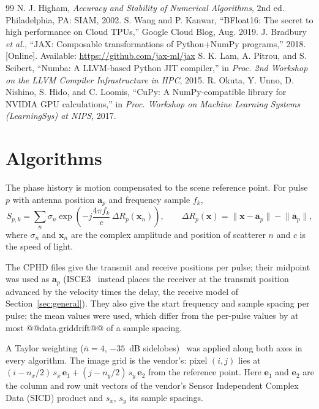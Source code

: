 \documentclass[11pt]{article}
\begin{document}
\begin{thebibliography}{99}
 N. J. Higham, \emph{Accuracy and Stability of Numerical Algorithms}, 2nd ed. Philadelphia, PA: SIAM, 2002.
 S. Wang and P. Kanwar, ``BFloat16: The secret to high performance on Cloud TPUs,'' Google Cloud Blog, Aug. 2019.
 J. Bradbury \emph{et al.}, ``JAX: Composable transformations of Python+NumPy programs,'' 2018. [Online]. Available: \url{https://github.com/jax-ml/jax}
 S. K. Lam, A. Pitrou, and S. Seibert, ``Numba: A LLVM-based Python JIT compiler,'' in \emph{Proc. 2nd Workshop on the LLVM Compiler Infrastructure in HPC}, 2015.
 R. Okuta, Y. Unno, D. Nishino, S. Hido, and C. Loomis, ``CuPy: A NumPy-compatible library for NVIDIA GPU calculations,'' in \emph{Proc. Workshop on Machine Learning Systems (LearningSys) at NIPS}, 2017.
\end{thebibliography}

\appendix
\section{Algorithms}
\label{app:algorithms}

The phase history is motion compensated to the scene reference point. For pulse $p$ with antenna position $\mathbf{a}_p$ and frequency sample $f_k$,
\begin{equation}
S_{p,k} = \sum_n \sigma_n \exp\!\left(-j \frac{4\pi f_k}{c}\, \Delta R_p(\mathbf{x}_n)\right),
\qquad
\Delta R_p(\mathbf{x}) = \lVert \mathbf{x} - \mathbf{a}_p \rVert - \lVert \mathbf{a}_p \rVert ,
\label{eq:signal}
\end{equation}
where $\sigma_n$ and $\mathbf{x}_n$ are the complex amplitude and position of scatterer $n$ and $c$ is the speed of light.

The CPHD files give the transmit and receive positions per pulse; their midpoint was used as $\mathbf{a}_p$ (ISCE3~\cite{isce3} instead places the receiver at the transmit position advanced by the velocity times the delay, the receive model of Section~\ref{sec:general}). They also give the start frequency and sample spacing per pulse; the mean values were used, which differ from the per-pulse values by at most @@data.griddrift@@ of a sample spacing.

A Taylor weighting ($\bar{n}=4$, $-35$~dB sidelobes)~\cite{taylor1955} was applied along both axes in every algorithm. The image grid is the vendor's: pixel $(i, j)$ lies at $(i - n_x/2)\,s_x\,\mathbf{e}_1 + (j - n_y/2)\,s_y\,\mathbf{e}_2$ from the reference point. Here $\mathbf{e}_1$ and $\mathbf{e}_2$ are the column and row unit vectors of the vendor's Sensor Independent Complex Data (SICD) product and $s_x$, $s_y$ its sample spacings.
\end{document}
